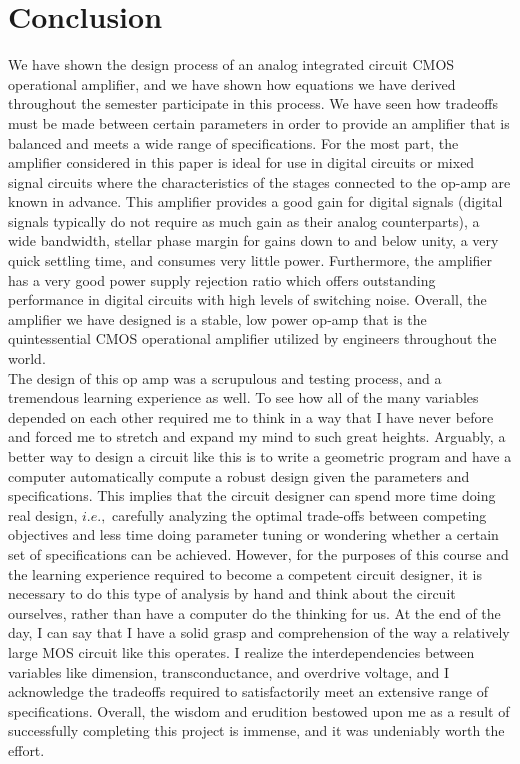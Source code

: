 \documentclass[]{article}
\begin{document}
		\section{Conclusion}
			We have shown the design process of an analog integrated circuit CMOS operational amplifier, and we have shown how equations we have derived throughout the semester participate in this process. We have seen how tradeoffs must be made between certain parameters in order to provide an amplifier that is balanced and meets a wide range of specifications. For the most part, the amplifier considered in this paper is ideal for use in digital circuits or mixed signal circuits where the characteristics of the stages connected to the op-amp are known in advance. This amplifier provides a good gain for digital signals (digital signals typically do not require as much gain as their analog counterparts), a wide bandwidth, stellar phase margin for gains down to and below unity, a very quick settling time, and consumes very little power. Furthermore, the amplifier has a very good power supply rejection ratio which offers outstanding performance in digital circuits with high levels of switching noise. Overall, the amplifier we have designed is a stable, low power op-amp that is the quintessential CMOS operational amplifier utilized by engineers throughout the world.
			$$$$
			The design of this op amp was a scrupulous and testing process, and a tremendous learning experience as well. To see how all of the many variables depended on each other required me to think in a way that I have never before and forced me to stretch and expand my mind to such great heights. Arguably, a better way to design a circuit like this is to write a geometric program and have a computer automatically compute a robust design given the parameters and specifications. This implies that the circuit designer can spend more time doing real design, $i.e.,$ carefully analyzing the optimal trade-offs between competing objectives and less time doing parameter tuning or wondering whether a certain set of specifications can be achieved. However, for the purposes of this course and the learning experience required to become a competent circuit designer, it is necessary to do this type of analysis by hand and think about the circuit ourselves, rather than have a computer do the thinking for us. At the end of the day, I can say that I have a solid grasp and comprehension of the way a relatively large MOS circuit like this operates. I realize the interdependencies between variables like dimension, transconductance, and overdrive voltage, and I acknowledge the tradeoffs required to satisfactorily meet an extensive range of specifications. Overall, the wisdom and erudition bestowed upon me as a result of successfully completing this project is immense, and it was undeniably worth the effort.
		
\end{document}
